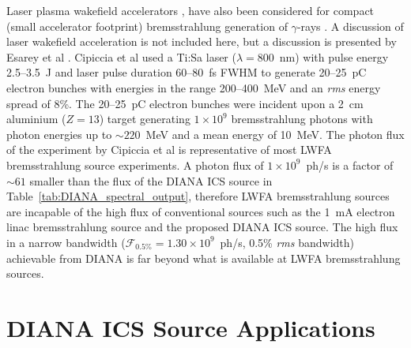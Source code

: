 \documentclass[../main.tex]{subfiles}
\begin{document}
Laser plasma wakefield accelerators \cite{sprangle1988laser,esarey2009physics}, have also been considered for compact (small accelerator footprint) bremsstrahlung generation of $\gamma$-rays \cite{cipiccia2012tuneable,lemos2018bremsstrahlung}. A discussion of laser wakefield acceleration is not included here, but a discussion is presented by Esarey et al \cite{esarey2009physics}. Cipiccia et al \cite{cipiccia2012tuneable} used a Ti:Sa laser ($\lambda = 800$~\si{\nano\meter}) with pulse energy 2.5--3.5~\si{\joule} and laser pulse duration 60--80~\si{\femto\second} FWHM to generate 20--25~\si{\pico\coulomb} electron bunches with energies in the range 200--400~\si{\mega\electronvolt} and an \textit{rms} energy spread of 8\%. The 20--25~\si{\pico\coulomb} electron bunches were incident upon a 2~\si{\centi\meter} aluminium ($Z=13$) target generating $1\times 10^{9}$ bremsstrahlung photons with photon energies up to $\sim 220$~\si{\mega\electronvolt} and a mean energy of 10~\si{\mega\electronvolt}. The photon flux of the experiment by Cipiccia et al \cite{cipiccia2012tuneable} is representative of most LWFA bremsstrahlung source experiments. A photon flux of $1\times 10^{9}$~ph/\si{\second} is a factor of $\sim 61$ smaller than the flux of the DIANA ICS source in Table~\ref{tab:DIANA_spectral_output}, therefore LWFA bremsstrahlung sources are incapable of the high flux of conventional sources such as the 1~\si{\milli\ampere} electron linac bremsstrahlung source and the proposed DIANA ICS source. The high flux in a narrow bandwidth ($\mathcal{F}_{\mathrm{0.5\%}} = 1.30\times 10^{9}$~ph/\si{\second}, 0.5\% \textit{rms} bandwidth) achievable from DIANA is far beyond what is available at LWFA bremsstrahlung sources.    

\section{DIANA ICS Source Applications}
\label{sec:DIANA_ICS_applications}
\end{document}
